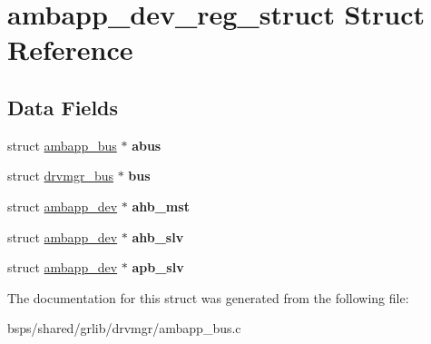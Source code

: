 \hypertarget{structambapp__dev__reg__struct}{}\section{ambapp\+\_\+dev\+\_\+reg\+\_\+struct Struct Reference}
\label{structambapp__dev__reg__struct}
\subsection*{Data Fields}
\begin{DoxyCompactItemize}
\item 
\mbox{\label{structambapp__dev__reg__struct_a57ff5dae5df63e059c5e3c4c251d2452}} 
struct \mbox{\hyperlink{structambapp__bus}{ambapp\+\_\+bus}} $\ast$ {\bfseries abus}
\item 
\mbox{\label{structambapp__dev__reg__struct_aa762aae49de3cdeaa04a1fe4ac744cb9}} 
struct \mbox{\hyperlink{structdrvmgr__bus}{drvmgr\+\_\+bus}} $\ast$ {\bfseries bus}
\item 
\mbox{\label{structambapp__dev__reg__struct_ac645d3ff3ad42deaff63e320e2fd401b}} 
struct \mbox{\hyperlink{structambapp__dev}{ambapp\+\_\+dev}} $\ast$ {\bfseries ahb\+\_\+mst}
\item 
\mbox{\label{structambapp__dev__reg__struct_ad0cf0880e7318b8e8037fa197590b97b}} 
struct \mbox{\hyperlink{structambapp__dev}{ambapp\+\_\+dev}} $\ast$ {\bfseries ahb\+\_\+slv}
\item 
\mbox{\label{structambapp__dev__reg__struct_aec8909d006aec18ae7386945001640e1}} 
struct \mbox{\hyperlink{structambapp__dev}{ambapp\+\_\+dev}} $\ast$ {\bfseries apb\+\_\+slv}
\end{DoxyCompactItemize}


The documentation for this struct was generated from the following file\+:\begin{DoxyCompactItemize}
\item 
bsps/shared/grlib/drvmgr/ambapp\+\_\+bus.\+c\end{DoxyCompactItemize}
